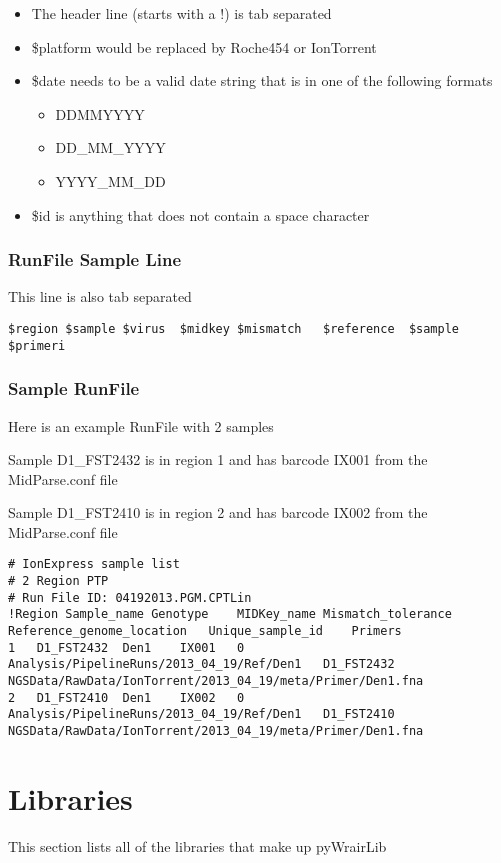 \documentclass{article}
\begin{document}
\begin{itemize}
 \item The header line (starts with a !) is tab separated
 \item \$platform would be replaced by Roche454 or IonTorrent
 \item \$date needs to be a valid date string that is in one of the following formats
 \begin{itemize}
  \item DDMMYYYY
  \item DD\_MM\_YYYY
  \item YYYY\_MM\_DD
 \end{itemize}
 \item \$id is anything that does not contain a space character
\end{itemize}
\subsubsection{RunFile Sample Line}
This line is also tab separated
\begin{lstlisting}[basicstyle=\tiny]
$region	$sample	$virus	$midkey	$mismatch	$reference	$sample	$primeri	
\end{lstlisting}

\subsubsection{Sample RunFile}
Here is an example RunFile with 2 samples

Sample D1\_FST2432 is in region 1 and has barcode IX001 from the MidParse.conf file	

Sample D1\_FST2410 is in region 2 and has barcode IX002 from the MidParse.conf file	

\begin{landscape}
{\tiny
\begin{lstlisting}[basicstyle=\tiny]
# IonExpress sample list
# 2 Region PTP
# Run File ID: 04192013.PGM.CPTLin
!Region	Sample_name	Genotype	MIDKey_name	Mismatch_tolerance	Reference_genome_location	Unique_sample_id	Primers	
1	D1_FST2432	Den1	IX001	0	Analysis/PipelineRuns/2013_04_19/Ref/Den1	D1_FST2432	NGSData/RawData/IonTorrent/2013_04_19/meta/Primer/Den1.fna	
2	D1_FST2410	Den1	IX002	0	Analysis/PipelineRuns/2013_04_19/Ref/Den1	D1_FST2410	NGSData/RawData/IonTorrent/2013_04_19/meta/Primer/Den1.fna	
\end{lstlisting}
}
\end{landscape}

\section{Libraries}
This section lists all of the libraries that make up pyWrairLib
\end{document}
